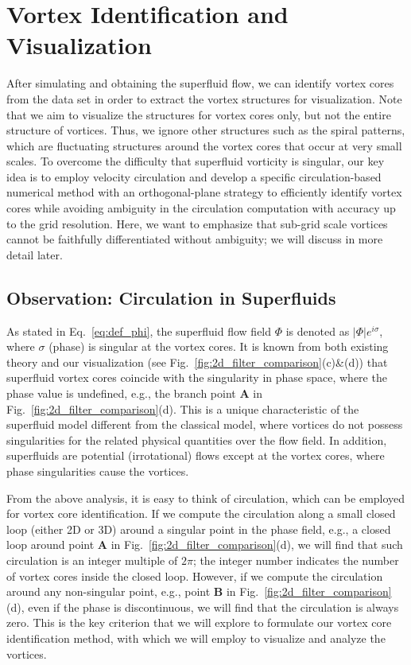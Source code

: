 \documentclass[10pt,journal,compsoc,twoside]{IEEEtran}
\begin{document}
	
	\section{Vortex Identification and Visualization}
	\label{sec:vortex_tube_extraction}
	
	After simulating and obtaining the superfluid flow, we can identify vortex cores from the data set in order to extract the vortex structures for visualization.
	Note that we aim to visualize the structures for vortex cores only, but not the entire structure of vortices.
	Thus, we ignore other structures such as the spiral patterns, which are fluctuating structures around the vortex cores that occur at very small scales.
	To overcome the difficulty that superfluid vorticity is singular, our key idea is to employ velocity circulation and develop a specific circulation-based numerical method with an orthogonal-plane strategy to efficiently identify vortex cores while avoiding ambiguity in the circulation computation with accuracy up to the grid resolution.
	Here, we want to emphasize that sub-grid scale vortices cannot be faithfully differentiated without ambiguity; we will discuss in more detail later.
	
	

	\subsection{Observation: Circulation in Superfluids}
	As stated in Eq.~\ref{eq:def_phi}, the superfluid flow field $\Phi$ is denoted as $|\Phi| e^{i\sigma}$, where $\sigma$ (phase) is singular at the vortex cores.
	It is known from both existing theory and our visualization (see Fig.~\ref{fig:2d_filter_comparison}(c)\&(d)) that superfluid vortex cores coincide with the singularity in phase space, where the phase value is undefined, e.g., the branch point \textbf{A} in Fig.~\ref{fig:2d_filter_comparison}(d).
	This is a unique characteristic of the superfluid model different from the classical model, where vortices do not possess singularities for the related physical quantities over the flow field.
	In addition, superfluids are potential (irrotational) flows except at the vortex cores, where phase singularities cause the vortices.
	
	From the above analysis, it is easy to think of circulation, which can be employed for vortex core identification.
	If we compute the circulation along a small closed loop (either 2D or 3D) around a singular point in the phase field, e.g., a closed loop around point \textbf{A} in Fig.~\ref{fig:2d_filter_comparison}(d), we will find that such circulation is an integer multiple of $2\pi$; the integer number indicates the number of vortex cores inside the closed loop.
	However, if we compute the circulation around any non-singular point, e.g., point \textbf{B} in Fig.~\ref{fig:2d_filter_comparison}(d), even if the phase is discontinuous, we will find that the circulation is always zero.
	This is the key criterion that we will explore to formulate our vortex core identification method, with which we will employ to visualize and analyze the vortices.
	
\end{document}
